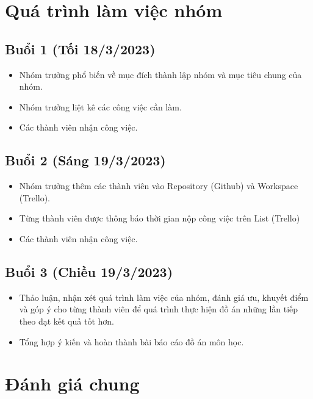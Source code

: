 \documentclass[../main-report.tex]{subfiles}
\begin{document}
\section{Quá trình làm việc nhóm}

\subsection{Buổi 1 (Tối 18/3/2023)}

\begin{itemize}

\item Nhóm trưởng phổ biến về mục đích thành lập nhóm và mục tiêu chung của nhóm.
\item Nhóm trưởng liệt kê các công việc cần làm.
\item Các thành viên nhận công việc.

\end{itemize}

\subsection{Buổi 2 (Sáng 19/3/2023)}

\begin{itemize}

\item Nhóm trưởng thêm các thành viên vào Repository (Github) và Workspace (Trello).
\item Từng thành viên được thông báo thời gian nộp công việc trên List (Trello)
\item Các thành viên nhận công việc.

\end{itemize}

\subsection{Buổi 3 (Chiều 19/3/2023)}

\begin{itemize}

\item Thảo luận, nhận xét quá trình làm việc của nhóm, đánh giá ưu, khuyết điểm và góp ý cho từng thành viên để quá trình thực hiện đồ án những lần tiếp theo đạt kết quả tốt hơn.
\item Tổng hợp ý kiến và hoàn thành bài báo cáo đồ án môn học.
\end{itemize}

\section{Đánh giá chung}
\end{document}
